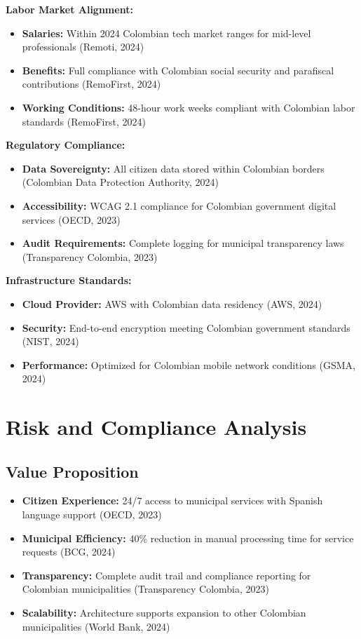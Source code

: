 \documentclass[12pt,a4paper]{article}
\begin{document}
\textbf{Labor Market Alignment:}
\begin{itemize}
    \item \textbf{Salaries:} Within 2024 Colombian tech market ranges for mid-level professionals (Remoti, 2024)
    \item \textbf{Benefits:} Full compliance with Colombian social security and parafiscal contributions (RemoFirst, 2024)
    \item \textbf{Working Conditions:} 48-hour work weeks compliant with Colombian labor standards (RemoFirst, 2024)
\end{itemize}

\textbf{Regulatory Compliance:}
\begin{itemize}
    \item \textbf{Data Sovereignty:} All citizen data stored within Colombian borders (Colombian Data Protection Authority, 2024)
    \item \textbf{Accessibility:} WCAG 2.1 compliance for Colombian government digital services (OECD, 2023)
    \item \textbf{Audit Requirements:} Complete logging for municipal transparency laws (Transparency Colombia, 2023)
\end{itemize}

\textbf{Infrastructure Standards:}
\begin{itemize}
    \item \textbf{Cloud Provider:} AWS with Colombian data residency (AWS, 2024)
    \item \textbf{Security:} End-to-end encryption meeting Colombian government standards (NIST, 2024)
    \item \textbf{Performance:} Optimized for Colombian mobile network conditions (GSMA, 2024)
\end{itemize}

\section{Risk and Compliance Analysis}

\subsection{Value Proposition}

\begin{itemize}
    \item \textbf{Citizen Experience:} 24/7 access to municipal services with Spanish language support (OECD, 2023)
    \item \textbf{Municipal Efficiency:} 40\% reduction in manual processing time for service requests (BCG, 2024)
    \item \textbf{Transparency:} Complete audit trail and compliance reporting for Colombian municipalities (Transparency Colombia, 2023)
    \item \textbf{Scalability:} Architecture supports expansion to other Colombian municipalities (World Bank, 2024)
\end{itemize}
\end{document}
